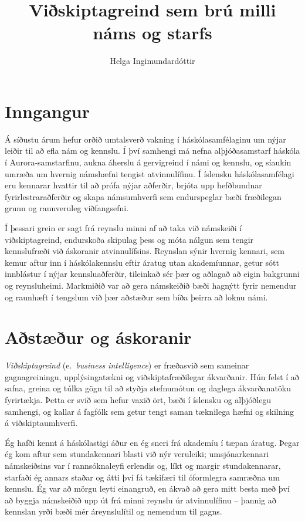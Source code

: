 \documentclass{article}
\title{Viðskiptagreind sem brú milli náms og starfs}
\date{}
\author{Helga Ingimundardóttir}
\begin{document}
\maketitle

\section*{Inngangur}
Á síðustu árum hefur orðið umtalsverð vakning í háskólasamfélaginu um nýjar leiðir til að efla nám og kennslu. Í því samhengi má nefna alþjóðasamstarf háskóla í Aurora-samstarfinu, aukna áherslu á gervigreind í námi og kennslu, og síaukin umræða um hvernig námshæfni tengist atvinnulífinu. Í íslensku háskólasamfélagi eru kennarar hvattir til að prófa nýjar aðferðir, brjóta upp hefðbundnar fyrirlestraraðferðir og skapa námsumhverfi sem endurspeglar bæði fræðilegan grunn og raunveruleg viðfangsefni.

Í þessari grein er sagt frá reynslu minni af að taka við námskeiði í viðskiptagreind, endurskoða skipulag þess og móta nálgun sem tengir kennslufræði við áskoranir atvinnulífsins. Reynslan sýnir hvernig kennari, sem kemur aftur inn í háskólakennslu eftir áratug utan akademíunnar, getur sótt innblástur í nýjar kennsluaðferðir, tileinkað sér þær og aðlagað að eigin bakgrunni og reynsluheimi. Markmiðið var að gera námskeiðið bæði hagnýtt fyrir nemendur og raunhæft í tengslum við þær aðstæður sem bíða þeirra að loknu námi.

\section*{Aðstæður og áskoranir}
\textit{Viðskiptagreind} (e.~\textit{business intelligence}) er fræðasvið sem sameinar gagnagreiningu, upplýsingatækni og viðskiptafræðilegar ákvarðanir. Hún felst í að safna, greina og túlka gögn til að styðja stefnumótun og daglega ákvarðanatöku fyrirtækja. Þetta er svið sem hefur vaxið ört, bæði í íslensku og alþjóðlegu samhengi, og kallar á fagfólk sem getur tengt saman tæknilega hæfni og skilning á viðskiptaumhverfi.

Ég hafði kennt á háskólastigi áður en ég sneri frá akademíu í tæpan áratug. Þegar ég kom aftur sem stundakennari blasti við nýr veruleiki; umsjónarkennari námskeiðsins var í rannsóknaleyfi erlendis og, líkt og margir stundakennarar, starfaði ég annars staðar og átti því fá tækifæri til óformlegra samræðna um kennslu. Ég var að mörgu leyti einangruð, en ákvað að gera mitt besta með því að byggja námskeiðið upp út frá minni reynslu úr atvinnulífinu -- þannig að kennslan yrði bæði mér áreynslulítil og nemendum til gagns.
\end{document}
